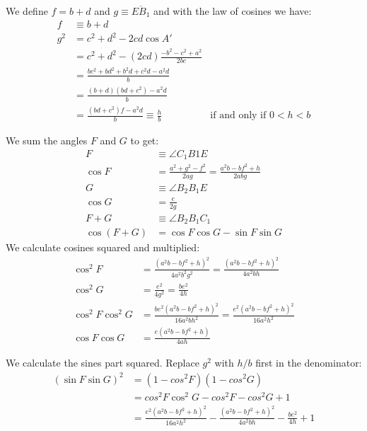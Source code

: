 \documentclass[11pt]{article}
\begin{document}
We define $f=b+d$ and $g \equiv \overline{EB_1}$ and with the law of cosines we have:
\begin{align}
f &\equiv b + d\\
g^2 &= c^2 + d^2 - 2cd\cos{A'}\\
 &= c^2 + d^2 - (2cd)\frac{-b^2 - c^2 + a^2}{2bc}\\
 &= \frac{bc^2 + bd^2 + b^2d + c^2d - a^2d}{b}\\
 &= \frac{(b+d)(bd+c^2) - a^2d }{b}\\
 &= \frac{(bd+c^2)f - a^2d}{b} \equiv \frac{h}{b} &\text{if and only if } 0 < h < b
\end{align}

We sum the angles $F$ and $G$ to get:
\begin{align}
F &\equiv \angle{C_1B1E}\\
\cos{F} &= \frac{a^2 + g^2 - f^2}{2ag} = \boxed{\frac{a^2b - bf^2 + h}{2abg}}\\
G &\equiv \angle{B_2B_1E}\\
\cos{G} &= \boxed{ \frac{e}{2g} }\\
F+G &\equiv \angle{B_2B_1C_1}\\
\cos{(F+G)} &= \cos{F}\cos{G} - \sin{F}\sin{G}
\end{align}
We calculate cosines squared and multiplied:
\begin{align}
\cos^2{F} &= \frac{(a^2b - bf^2 + h)^2}{4a^2b^2g^2}
 = \boxed{\frac{(a^2b - bf^2 + h)^2}{4a^2bh}}\\
\cos^2{G} &= \frac{e^2}{4g^2} = \boxed{\frac{be^2}{4h}}\\
\cos^2{F}\cos^2{G} &= \frac{be^2(a^2b - bf^2 + h)^2}{16a^2bh^2}
 = \boxed{\frac{e^2(a^2b - bf^2 + h)^2}{16a^2h^2}}\\
\cos{F}\cos{G} &= \boxed{\frac{e(a^2b - bf^2 + h)}{4ah}}
\end{align}

We calculate the sines part squared. Replace $g^2$ with $h/b$ first in the denominator:
\begin{align}
(\sin{F}\sin{G})^2 &= (1 - cos^2{F})(1 - cos^2{G})\\
 &= cos^2{F}\cos^2{G} - cos^2{F} - cos^2{G} + 1\\
 &= \frac{e^2(a^2b - bf^2 + h)^2}{16a^2h^2}
 - \frac{(a^2b - bf^2 + h)^2}{4a^2bh}
 - \frac{be^2}{4h}
 + 1
\end{align}
\end{document}
